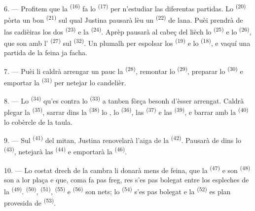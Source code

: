 6. --- Profitem que la  \textsuperscript{(16)} fa lo
 \textsuperscript{(17)} per n'estudiar las diferentas partidas. Lo
 \textsuperscript{(20)} pòrta un bon 
\textsuperscript{(21)} sul qual Justina pausarà lèu un 
\textsuperscript{(22)} de lana. Puèi prendrà de las cadièiras los dos
 \textsuperscript{(23)} e la 
\textsuperscript{(24)}. Aprèp pausarà al cabeç del lièch lo 
\textsuperscript{(25)} e lo  \textsuperscript{(26)}, que son amb
l' \textsuperscript{(27)} sul 
\textsuperscript{(32)}. Un plumalh per espolsar los 
\textsuperscript{(19)} e lo  \textsuperscript{(18)}, e vaquí
una partida de la feina ja facha.

7. --- Puèi li caldrà arrengar un pauc la 
\textsuperscript{(28)}, remontar lo  \textsuperscript{(29)},
preparar lo  \textsuperscript{(30)} e emportar la
 \textsuperscript{(31)} per netejar lo candelièr.

\VUsaut{5.0mm}
\VUsaut{3.0mm}

8. --- Lo  \textsuperscript{(34)} qu'es contra lo
 \textsuperscript{(33)} a tanben fòrça besonh d'èsser arrengat.
Caldrà plegar la  \textsuperscript{(35)}, sarrar dins la
 \textsuperscript{(38)} lo , lo
 \textsuperscript{(36)}, las 
\textsuperscript{(37)} e las  \textsuperscript{(39)}, e barrar amb
la  \textsuperscript{(40)} lo cobèrcle de la taula.

9. --- Sul  \textsuperscript{(41)} del mitan, Justina renovelarà
l'aiga de la  \textsuperscript{(42)}. Pausarà de  dins
lo  \textsuperscript{(43)}, netejarà las 
\textsuperscript{(44)} e emportarà la 
\textsuperscript{(46)}.

10. --- Lo costat drech de la cambra li donarà mens de feina, que la
 \textsuperscript{(47)} e son 
\textsuperscript{(48)} son a lor plaça e que, coma fa pas freg, res s'es pas
bolegat entre los espleches de la  \textsuperscript{(49)}.
 \textsuperscript{(50)},  \textsuperscript{(51)},
 \textsuperscript{(55)} e 
\textsuperscript{(56)} son nets; lo  \textsuperscript{(54)} s'es
pas bolegat e la  \textsuperscript{(52)} es plan
provesida de  \textsuperscript{(53)}.

